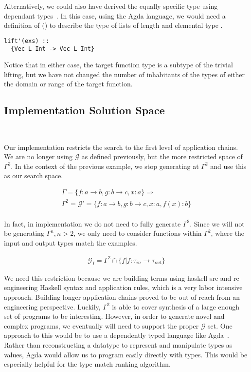 Alternatively, we could also have derived the equally specific type using dependant types~\cite{DBLP:journals/jfp/McBride02}.
In this case, using the Agda language, we would need a definition of () to describe the type of lists of length  and elemental type .

\begin{lstlisting}
lift'(exs) ::
  {Vec L Int -> Vec L Int}
\end{lstlisting}

Notice that in either case, the target function type is a subtype of the trivial lifting, but we have not changed the number of inhabitants of the types of either the domain or range of the target function.

\subsection{Implementation Solution Space}\label{solnSpace}\

Our implementation restricts the search to the first level of application chains.
We are no longer using $\mathcal{G}$ as defined previously, but the more restricted space of $\Gamma^2$.
In the context of the previous example, we stop generating at $\Gamma^2$ and use this as our search space.

\begin{gather*}
\Gamma = \{f:a\to b, g:b\to c, x:a\} \Rightarrow \\
\Gamma^2 = \mathcal{G}' = \{f:a\to b, g:b\to c, x:a, f(x):b\}\\
\end{gather*}

In fact, in implementation we do not need to fully generate $\Gamma^2$.
Since we will not be generating $\Gamma^n, n>2$, we only need to consider functions within $\Gamma^2$, where the input and output types match the examples.

\begin{gather*}
\mathcal{G}_I = \Gamma^2 \cap \{f | f : \tau_{in} \to \tau_{out}\}
\end{gather*}

We need this restriction because we are building terms using haskell-src and re-engineering Haskell syntax and application rules, which is a very labor intensive approach.
Building longer application chains proved to be out of reach from an engineering perspective.
Luckily, $\Gamma^2$ is able to cover synthesis of a large enough set of programs to be interesting.
However, in order to generate novel and complex programs, we eventually will need to support the proper $\mathcal{G}$ set.
One approach to this would be to use a dependently typed language like Agda~\cite{agda}.
Rather than reconstructing a datatype to represent and manipulate types as values, Agda would allow us to program easily directly with types.
This would be especially helpful for the type match ranking algorithm.

